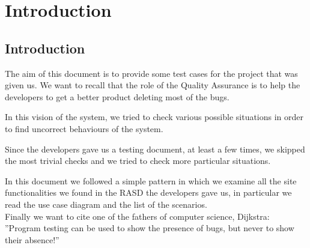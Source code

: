 
\chapter{Introduction}

\label{cap:introduction}


\section{Introduction}

The aim of this document is to provide some test cases for the project
that was given us. We want to recall that the role of the Quality
Assurance is to help the developers to get a better product deleting
most of the bugs.

In this vision of the system, we tried to check various possible situations
in order to find uncorrect behaviours of the system.

Since the developers gave us a testing document, at least a few times,
we skipped the most trivial checks and we tried to check more particular
situations.

In this document we followed a simple pattern in which we examine
all the site functionalities we found in the RASD the developers gave
us, in particular we read the use case diagram and the list of the
scenarios. \\


Finally we want to cite one of the fathers of computer science, Dijkstra:
''Program testing can be used to show the presence of bugs, but never
to show their absence!'' 
